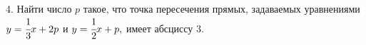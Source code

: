 4. Найти число $p$ такое, что точка пересечения прямых, задаваемых уравнениями \\ $y=\cfrac{1}{3}x+2p$ и $y=\cfrac{1}{2}x+p,$ имеет абсциссу 3.\\
